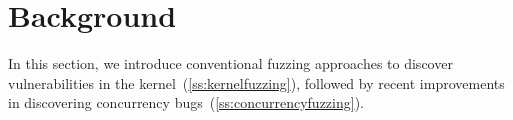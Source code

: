 \section{Background}
\label{s:background}

%


In this section, we introduce conventional fuzzing approaches to
discover vulnerabilities in the kernel~(\autoref{ss:kernelfuzzing}),
followed by recent improvements in discovering concurrency
bugs~(\autoref{ss:concurrencyfuzzing}).











